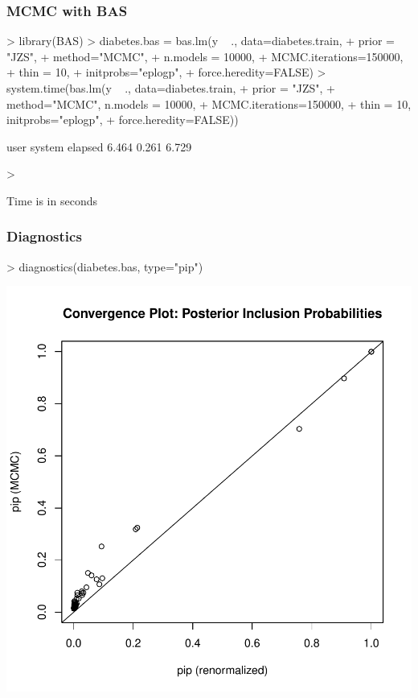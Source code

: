 \documentclass[]{beamer}
\begin{document}
\begin{frame}[fragile]\frametitle{MCMC with BAS}
\begin{Schunk}
\begin{Sinput}
> library(BAS)
> diabetes.bas = bas.lm(y ~ ., data=diabetes.train,
+                       prior = "JZS",
+                       method="MCMC",
+                       n.models = 10000,
+                       MCMC.iterations=150000,
+                       thin = 10,
+                       initprobs="eplogp",
+                       force.heredity=FALSE)
> system.time(bas.lm(y ~ ., data=diabetes.train, 
+                    prior = "JZS",
+                    method="MCMC", n.models = 10000,
+                    MCMC.iterations=150000,
+                    thin = 10,  initprobs="eplogp",
+                    force.heredity=FALSE))
\end{Sinput}
\begin{Soutput}
   user  system elapsed 
  6.464   0.261   6.729 
\end{Soutput}
\begin{Sinput}
> 
\end{Sinput}
\end{Schunk}

Time is in seconds

\end{frame}



\begin{frame}[fragile] \frametitle{Diagnostics}

\begin{Schunk}
\begin{Sinput}
> diagnostics(diabetes.bas, type="pip")
\end{Sinput}
\end{Schunk}
\includegraphics{16-bma-diagnostics}

\end{frame}
\end{document}
